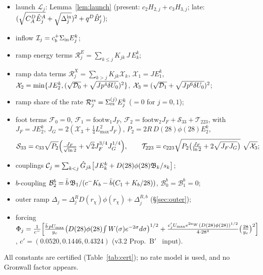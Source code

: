 \documentclass[11pt]{article}
\theoremstyle{definition}\newtheorem{definition}[theorem]{Definition}
\theoremstyle{remark}\newtheorem{remark}[theorem]{Remark}
\begin{document}
\begin{proposition}[U]
\begin{itemize}[leftmargin=*,itemsep=1pt]
\item launch $\mathcal L_j$: Lemma~\ref{lem:launch} (present: $c_2H_{2,j}+c_3H_{3,j}$; late: $(\sqrt{C_A^D\hat E^A_j}+\sqrt{\Delta^{\rm in}_j})^2+q^D\hat B'_j$);
\item inflow $\mathcal I_j=c^+_b\Sigma_{\rm in}E^k_j$;
\item ramp energy terms $\mathcal R^E_j=\sum_{k\le j}K_{jk}\,J\,E^k_k$;
\item ramp data terms $\mathcal R^X_j=\sum_{k>j}K_{jk}\mathcal X_k$, $\mathcal X_1=JE^k_1$, $\mathcal X_2=\min\{JE^k_2,(\sqrt{\mathcal D_0}+\sqrt{Jp^4\delta U_0})^2\}$, $\mathcal X_3=(\sqrt{\mathcal D_1}+\sqrt{Jp^6\delta U_0})^2$;
\item ramp share of the rate $\mathcal R^{\rm rs}_j=\Sigma^{(j)}_{\rm rs}E^k_j$ ($=0$ for $j=0,1$);
\item foot terms $\mathcal F_0=0$, $\mathcal F_1=\mathrm{footw}_1J_F$, $\mathcal F_2=\mathrm{footw}_2J_F+\mathcal S_{33}+\mathcal T_{223}$, with $J_F=JE^k_2$, $J_G=2(\mathcal X_3+\frac14L_{\max}^2J_F)$, $P_2=2R\,D(28)\phi(28)E^k_2$,
\[
\mathcal S_{33}=c_{33}\sqrt{P_2}\Bigl(\tfrac{J_F}{\sqrt{\ln2}}+\sqrt2J_F^{3/4}J_G^{1/4}\Bigr),\qquad\mathcal T_{223}=c_{223}\sqrt{P_2\bigl(\tfrac{J_F}{\ln2}+2\sqrt{J_FJ_G}\bigr)}\ \sqrt{\mathcal X_3};
\]
\item couplings $\mathcal C_j=\sum_{k<j}\hat G_{jk}\bigl[JE^k_k+D(28)\phi(28)\mathfrak B_k/s_k\bigr]$;
\item $b$-coupling $\mathcal B^b_2=\bar b\,\mathfrak B_1/(c^-K_b-\bar b(C_1+K_b/28))$, $\mathcal B^b_0=\mathcal B^b_1=0$;
\item outer ramp $\Delta_j=\Delta^R_jD(r_\chi)\phi(r_\chi)+\Delta^{R,b}_j$ (\S\ref{sec:outer});
\item forcing $\Phi_j=\frac1{c^-}\Bigl[\frac{\bar b\,pU_{\max}}{y_c}\bigl(D(28)\phi(28)\!\int W(\sigma)e^{-2\sigma}d\sigma\bigr)^{1/2}+\frac{c'_jU_{\max}e^{2a_W}(D(28)\phi(28))^{1/2}}{4\cdot28^4}\bigl(\frac{28}{y_c}\bigr)^2\Bigr]$, $c'=(0.0520,0.1446,0.4324)$ (v3.2 Prop.~B$'$ \tP\ input).
\end{itemize}
All constants are certified (Table~\ref{tab:cert}); no rate model is used, and no Gronwall factor appears.
\end{proposition}
\end{document}
